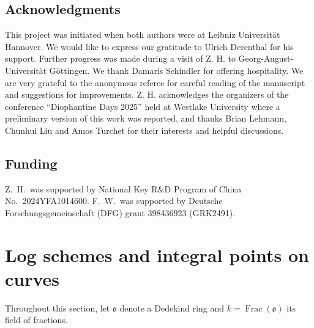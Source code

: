 \documentclass[a4paper, twoside, 11pt]{amsart}
\theoremstyle{definition}
\newcommand{\fo}{\mathfrak{o}}
\DeclareMathOperator{\Frac}{Frac}
\begin{document}
\subsection*{Acknowledgments}
This project was initiated when both authors were at Leibniz Universität Hannover. We would like to express our gratitude to Ulrich Derenthal for his support. Further progress was made during a visit of Z. H. to Georg-August-Universität Göttingen. We thank Damaris Schindler for offering hospitality. We are very grateful to the anonymous referee for careful reading of the manuscript and suggestions for improvements. Z. H. acknowledges the organizers of the conference ``Diophantine Days 2025'' held at Westlake University where a preliminary version of this work was reported, and thanks Brian Lehmann, Chunhui Liu and Amos Turchet for their interests and helpful discussions. 

\subsection*{Funding}
Z.~H.\ was supported by National Key R\&D Program of China No.\ 2024YFA1014600. F.~W.\ was supported by Deutsche Forschungsgemeinschaft (DFG) grant 398436923 (GRK2491).

\section{Log schemes and integral points on curves}\label{sec:schemes-and-curves}
Throughout this section, let $\fo$ denote a Dedekind ring and $k=\Frac(\fo)$ its field of fractions.
\end{document}

